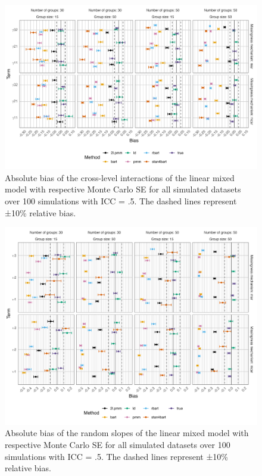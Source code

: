 \documentclass[10pt, a4paper, titlepage]{article}
\begin{document}
\begin{figure}[H]
    \centering
    \includegraphics[width=1\textwidth]{biascrosslevel.png}
    \caption{Absolute bias of the cross-level interactions of the linear mixed model with respective Monte Carlo SE for all simulated datasets over 100 simulations with ICC = .5. The dashed lines represent ±10\% relative bias.}
    \label{fig:biascrosslevel}
\end{figure}

\begin{figure}[H]
    \centering
    \includegraphics[width=1\textwidth]{biasrandom.png}
    \caption{Absolute bias of the random slopes of the linear mixed model with respective Monte Carlo SE for all simulated datasets over 100 simulations with ICC = .5. The dashed lines represent ±10\% relative bias.}
    \label{fig:biasrandom}
\end{figure}
\end{document}

